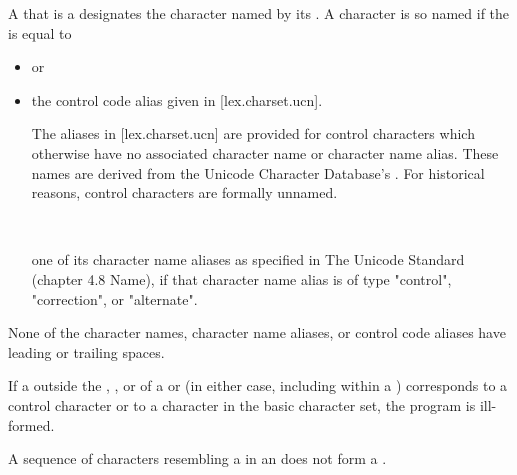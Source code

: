 \documentclass{wg21}
\begin{document}
\pnum
A 
that is a 
designates the character named by its .
A character is so named if the  is equal to
\begin{itemize}
    \item
    or
    \item
    \begin{removedblock}the control code alias given in [lex.charset.ucn].
    \begin{note}
        The aliases in [lex.charset.ucn] are provided for control characters
        which otherwise have no associated character name or character name alias.
        These names are derived from
        the Unicode Character Database's .
        For historical reasons, control characters are formally unnamed.
    \end{note}
    \end{removedblock}\\
    \begin{addedblock}
        one of its character name aliases as specified in The Unicode Standard (chapter 4.8 Name), if that character name alias is of type "control", "correction", or "alternate".
    \end{addedblock}
\end{itemize}
\begin{note}
    None of the  character names,
     character name aliases, or
    control code aliases
    have leading or trailing spaces.
\end{note}


\pnum
If a  outside
the , , or
 of
a  or 
(in either case, including within a )
corresponds to a control character or
to a character in the basic character set, the program is ill-formed.
\begin{note}
    A sequence of characters resembling a  in an
     does not form a
    .
\end{note}
\end{document}
